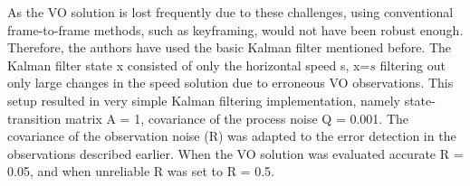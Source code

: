 As the
VO solution is lost frequently due to these challenges, using conventional frame-to-frame methods, such as keyframing,
would not have been robust enough. Therefore, the authors have used
the basic Kalman filter mentioned before. The Kalman filter
state x consisted of only the horizontal speed s, x=\begin{math} s\end{math} filtering
out only large changes in the speed solution due to erroneous
VO observations. This setup resulted in very simple Kalman
filtering implementation, namely state-transition matrix A = 1,
covariance of the process noise Q = 0.001. The covariance of
the observation noise (R) was adapted to the error detection
in the observations described earlier. When the VO solution
was evaluated accurate R = 0.05, and when unreliable R was
set to R = 0.5.\\



